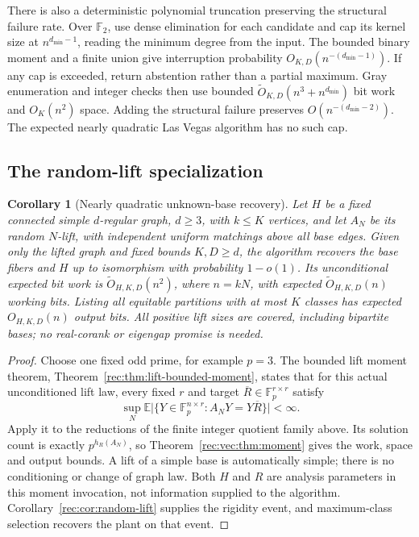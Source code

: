 \documentclass[11pt]{article}
\newtheorem{corollary}[theorem]{Corollary}
\theoremstyle{definition}
\theoremstyle{remark}
\newcommand{\E}{\mathbb E}
\newcommand{\1}{\mathbf 1}
\providecommand{\Fp}{\mathbb F_p}
\providecommand{\F}{\mathbb F}
\begin{document}
There is also a deterministic polynomial truncation preserving the
structural failure rate. Over $\F_2$, use dense elimination for each
candidate and cap its kernel size at $n^{d_{\min}-1}$, reading the minimum degree from the input. The bounded binary moment and a finite union give
interruption probability $O_{K,D}(n^{-(d_{\min}-1)})$.
If any cap is exceeded, return abstention rather than a partial maximum.
Gray enumeration and
integer checks then use bounded
$\widetilde O_{K,D}(n^3+n^{d_{\min}})$ bit work and $O_K(n^2)$ space.
Adding the structural failure preserves $O(n^{-(d_{\min}-2)})$.
The expected nearly quadratic Las Vegas algorithm has no such cap.

\subsection{The random-lift specialization}
\begin{corollary}[Nearly quadratic unknown-base recovery]
\label{rec:vec:cor:lift}
Let $H$ be a fixed connected simple $d$-regular graph, $d\ge3$,
with $k\le K$ vertices, and let $A_N$ be its random $N$-lift,
with independent uniform matchings above all base edges. Given only
the lifted graph and fixed bounds $K,D\ge d$, the algorithm recovers
the base fibers and $H$ up to isomorphism with probability $1-o(1)$.
Its unconditional expected bit work is
$\widetilde O_{H,K,D}(n^2)$, where $n=kN$, with expected
$\widetilde O_{H,K,D}(n)$ working bits. Listing all equitable
partitions with at most $K$ classes has expected $O_{H,K,D}(n)$
output bits. All positive lift sizes are covered, including bipartite
bases; no real-corank or eigengap promise is needed.
\end{corollary}
\begin{proof}
Choose one fixed odd prime, for example $p=3$. The bounded lift
moment theorem, Theorem~\ref{rec:thm:lift-bounded-moment}, states that
for this actual unconditioned lift law, every fixed $r$ and target
$\overline R\in\Fp^{r\times r}$ satisfy
\[
 \sup_N\E\bigl|\{Y\in\Fp^{n\times r}:A_NY=Y\overline R\}\bigr|
 <\infty.
\]
Apply it to the reductions of the finite integer quotient family
above. Its solution count is exactly $p^{h_R(A_N)}$, so
Theorem~\ref{rec:vec:thm:moment} gives the work, space and output bounds.
A lift of a simple base is automatically simple; there is no
conditioning or change of graph law. Both $H$ and $R$ are analysis
parameters in this moment invocation, not information supplied to
the algorithm. Corollary~\ref{rec:cor:random-lift} supplies the rigidity
event, and maximum-class selection recovers the plant on that event.
\end{proof}
\end{document}
